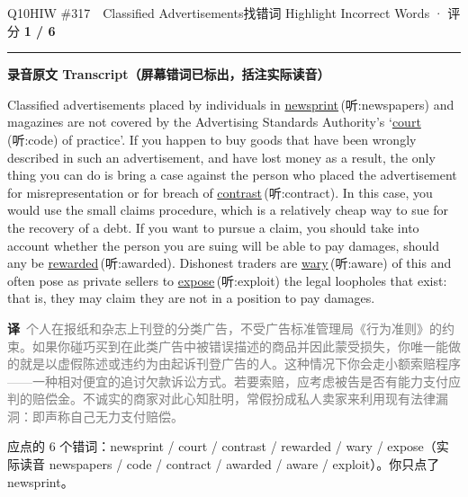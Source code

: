 \documentclass[11pt]{article}
\newcommand{\ptesub}[1]{%
  \par\needspace{2\baselineskip}\smallskip
  {\color{cAccent}\rule[-0.2ex]{3pt}{1.05em}}\hspace{6pt}%
  {\bfseries\color{cHead}#1}\par\nopagebreak\smallskip}
\newcommand{\zh}[1]{{\footnotesize\textcolor{cNote}{\textbf{译}}\ \textcolor{gray}{#1}}}
\newcommand{\hiw}[2]{{\color{cWrong}\uline{#1}}\,{\footnotesize\color{cFix}(听:#2)}} %
\begin{document}
\begin{qblock}{Q10\quad HIW \#317\ \ Classified Advertisements}{找错词 Highlight Incorrect Words · 评分 \textcolor{cAccent}{\bfseries 1 / 6}}
\ptesub{录音原文 Transcript（屏幕错词已标出，括注实际读音）}
\begin{promptbox}
Classified advertisements placed by individuals in \hiw{newsprint}{newspapers} and magazines are not covered by the Advertising Standards Authority's `\hiw{court}{code} of practice'. If you happen to buy goods that have been wrongly described in such an advertisement, and have lost money as a result, the only thing you can do is bring a case against the person who placed the advertisement for misrepresentation or for breach of \hiw{contrast}{contract}. In this case, you would use the small claims procedure, which is a relatively cheap way to sue for the recovery of a debt. If you want to pursue a claim, you should take into account whether the person you are suing will be able to pay damages, should any be \hiw{rewarded}{awarded}. Dishonest traders are \hiw{wary}{aware} of this and often pose as private sellers to \hiw{expose}{exploit} the legal loopholes that exist: that is, they may claim they are not in a position to pay damages.
\end{promptbox}
\zh{个人在报纸和杂志上刊登的分类广告，不受广告标准管理局《行为准则》的约束。如果你碰巧买到在此类广告中被错误描述的商品并因此蒙受损失，你唯一能做的就是以虚假陈述或违约为由起诉刊登广告的人。这种情况下你会走小额索赔程序——一种相对便宜的追讨欠款诉讼方式。若要索赔，应考虑被告是否有能力支付应判的赔偿金。不诚实的商家对此心知肚明，常假扮成私人卖家来利用现有法律漏洞：即声称自己无力支付赔偿。}
\par{\small 应点的 6 个错词：{\color{cWrong}newsprint / court / contrast / rewarded / wary / expose}\quad（实际读音 newspapers / code / contract / awarded / aware / exploit）。\;你只点了 {\color{cWrong}newsprint}。}
\end{qblock}
\end{document}
